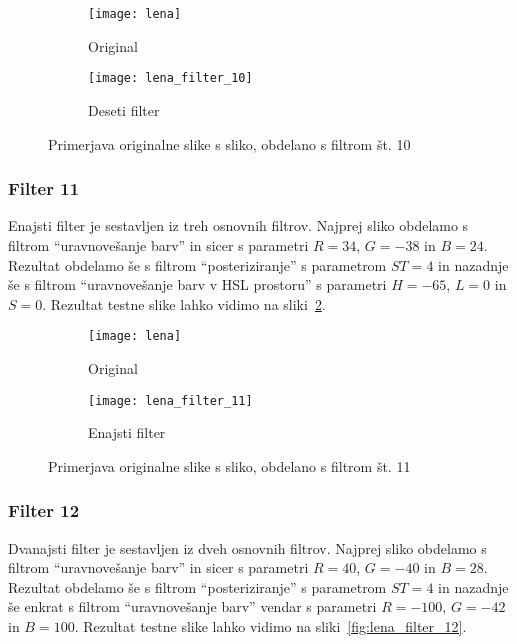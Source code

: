 \begin{figure}[!ht]
    \centering
    \begin{subfigure}[b]{0.4\textwidth}
        \texttt{[image: lena]}
        \caption{Original}
    \end{subfigure}
    \begin{subfigure}[b]{0.4\textwidth}
        \texttt{[image: lena\_filter\_10]}
        \caption{Deseti filter}
    \end{subfigure}
    \caption{Primerjava originalne slike s sliko, obdelano s filtrom št. 10}
    \label{fig:lena_filter_10}
\end{figure}


\subsubsection*{Filter 11}
Enajsti filter je sestavljen iz treh osnovnih filtrov. Najprej sliko obdelamo s
filtrom ``uravnovešanje barv'' in sicer s parametri $R = 34$, $G = -38$ in
$B = 24$. Rezultat obdelamo še s filtrom ``posteriziranje'' s parametrom
$ST= 4$ in nazadnje še s filtrom ``uravnovešanje barv v HSL prostoru'' s
parametri $H = -65$, $L = 0$ in $S = 0$. Rezultat testne slike lahko
vidimo na sliki~\ref{fig:lena_filter_11}.

\begin{figure}[!ht]
    \centering
    \begin{subfigure}[b]{0.4\textwidth}
        \texttt{[image: lena]}
        \caption{Original}
    \end{subfigure}
    \begin{subfigure}[b]{0.4\textwidth}
        \texttt{[image: lena\_filter\_11]}
        \caption{Enajsti filter}
    \end{subfigure}
    \caption{Primerjava originalne slike s sliko, obdelano s filtrom št. 11}
    \label{fig:lena_filter_11}
\end{figure}


\subsubsection*{Filter 12}
Dvanajsti filter je sestavljen iz dveh osnovnih filtrov. Najprej sliko obdelamo s
filtrom ``uravnovešanje barv'' in sicer s parametri $R = 40$, $G = -40$ in
$B = 28$. Rezultat obdelamo še s filtrom ``posteriziranje'' s parametrom
$ST= 4$ in nazadnje še enkrat s filtrom ``uravnovešanje barv'' vendar s
parametri $R = -100$, $G = -42$ in $B = 100$. Rezultat testne slike lahko
vidimo na sliki~\ref{fig:lena_filter_12}.

